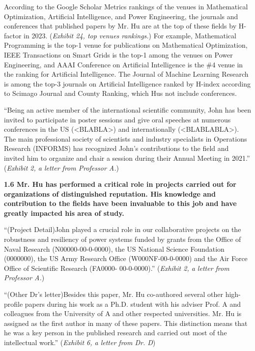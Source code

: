 \documentclass{article}
\begin{document}
According to the Google Scholar Metrics rankings of the venues in Mathematical Optimization, Artificial Intelligence, and Power Engineering, the journals and conferences that published papers by Mr. Hu are at the top of these fields by H-factor in 2023. ({\it Exhibit 24, top venues rankings.}) For example, Mathematical Programming is the top-1 venue for publications on Mathematical Optimization, IEEE Transactions on Smart Grids is the top-1 among the venues on Power Engineering, and AAAI Conference on Artificial Intelligence is the \#4 venue in the ranking for Artificial Intelligence. The Journal of Machine Learning Research is among the top-3 journals on Artificial Intelligence ranked by H-index according to Scimago Journal and County Ranking, which Hus not include conferences.

“Being an active member of the international scientific community, John has been invited to participate in poster sessions and give oral speeches at numerous conferences in the US (<BLABLA>) and internationally (<BLABLABLA>). The main professional society of scientists and industry specialists in Operations Research (INFORMS) has recognized John’s contributions to the field and invited him to organize and chair a session during their Annual Meeting in 2021.” ({\it Exhibit 2, a letter from Professor A.}) 

{\bf 1.6 Mr. Hu has performed a critical role in projects carried out for organizations of distinguished reputation. His knowledge and contribution to the fields have been invaluable to this job and have greatly impacted his area of study. }

“(Project Detail)John played a crucial role in our collaborative projects on the robustness and resiliency of power systems funded by grants from the Office of Naval Research (N00000-00-0-0000), the US National Science Foundation (0000000), the US Army Research Office (W000NF-00-0-0000) and the Air Force Office of Scientific Research (FA0000- 00-0-0000).” ({\it Exhibit 2, a letter from Professor A.}) 

“(Other Dr's letter)Besides this paper, Mr. Hu co-authored several other high-profile papers during his work as a Ph.D. student with his adviser Prof. A and colleagues from the University of A and other respected universities. Mr. Hu is assigned as the first author in many of these papers. This distinction means that he was a key person in the published research and carried out most of the intellectual work.” ({\it Exhibit 6, a letter from Dr. D}) 
\end{document}
